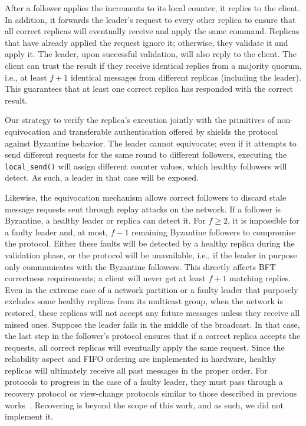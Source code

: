 After a follower applies the increments to its local counter, it replies to the client.
In addition, it forwards the leader's request to every other replica to ensure that all correct replicas will eventually receive and apply the same command. Replicas that have already applied the request ignore it; otherwise, they validate it and apply it. The leader, upon successful validation, will also reply to the client. The client can trust the result if they receive identical replies from a majority quorum, i.e., at least $f+1$ identical messages from different replicas (including the leader). This guarantees that at least one correct replica has responded with the correct result.


 Our strategy to verify the replica's execution jointly with the primitives of non-equivocation and transferable authentication offered by \projecttitle{} shields the protocol against Byzantine behavior. The leader cannot equivocate; even if it attempts to send different requests for the same round to different followers, executing the {\tt local\_send()} will assign different counter values, which healthy followers will detect. As such, a leader in that case will be exposed. 

Likewise, the equivocation mechanism allows correct followers to discard stale message requests sent through replay attacks on the network. If a follower is Byzantine, a healthy leader or replica can detect it. For $f\geq2$, it is impossible for a faulty leader and, at most, $f-1$ remaining Byzantine followers to compromise the protocol. Either these faults will be detected by a healthy replica during the validation phase, or the protocol will be unavailable, i.e., if the leader in purpose only communicates with the Byzantine followers. This directly affects BFT correctness requirements; a client will never get at least $f+1$ matching replies. Even in the extreme case of a network partition or a faulty leader that purposely excludes some healthy replicas from its multicast group, when the network is restored, these replicas will not accept any future messages unless they receive all missed ones. Suppose the leader fails in the middle of the broadcast. In that case, the last step in the follower's protocol ensures that if a correct replica accepts the requests, all correct replicas will eventually apply the same request. Since the reliability aspect and FIFO ordering are implemented in hardware, healthy replicas will ultimately receive all past messages in the proper order. For protocols to progress in the case of a faulty leader, they must pass through a recovery protocol or view-change protocols similar to those described in previous works~\cite{minBFT, Castro:2002}. Recovering is beyond the scope of this work, and as such, we did not implement it.


